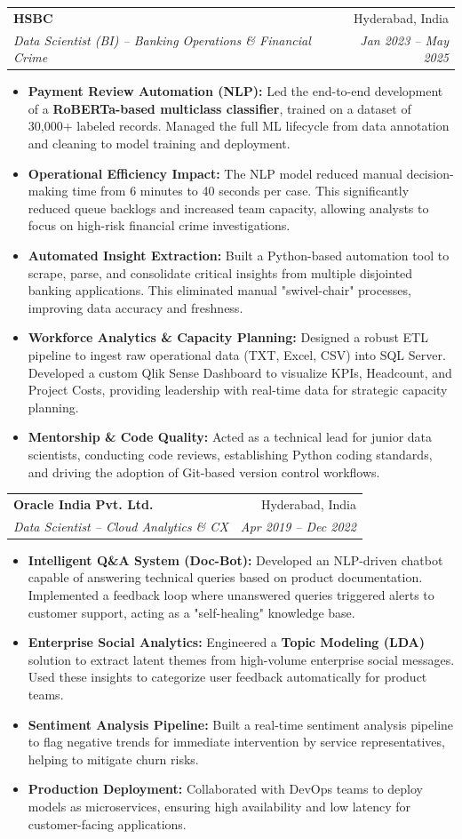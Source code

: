 \documentclass[letterpaper,10pt]{article}
\makeatletter
\newcommand{\resumeItem}[1]{
  \item\small{
    {#1 \vspace{1pt}} %
  }
}
\newcommand{\resumeSubheading}[4]{
  \vspace{-1pt}\item
    \begin{tabular*}{0.98\textwidth}[t]{l@{\extracolsep{\fill}}r}
      \textbf{#1} & #2 \\
      \textit{\small#3} & \textit{\small #4} \\
    \end{tabular*}\vspace{-6pt}
}
\newcommand{\resumeItemListStart}{\begin{itemize}}
\newcommand{\resumeItemListEnd}{\end{itemize}\vspace{-3pt}}
\makeatother
\begin{document}
    \resumeSubheading
      {HSBC}{Hyderabad, India}
      {Data Scientist (BI) -- Banking Operations \& Financial Crime}{Jan 2023 -- May 2025}
      \resumeItemListStart
        \resumeItem{\textbf{Payment Review Automation (NLP):} Led the end-to-end development of a \textbf{RoBERTa-based multiclass classifier}, trained on a dataset of 30,000+ labeled records. Managed the full ML lifecycle from data annotation and cleaning to model training and deployment.}
        \resumeItem{\textbf{Operational Efficiency Impact:} The NLP model reduced manual decision-making time from 6 minutes to 40 seconds per case. This significantly reduced queue backlogs and increased team capacity, allowing analysts to focus on high-risk financial crime investigations.}
        \resumeItem{\textbf{Automated Insight Extraction:} Built a Python-based automation tool to scrape, parse, and consolidate critical insights from multiple disjointed banking applications. This eliminated manual "swivel-chair" processes, improving data accuracy and freshness.}
        \resumeItem{\textbf{Workforce Analytics \& Capacity Planning:} Designed a robust ETL pipeline to ingest raw operational data (TXT, Excel, CSV) into SQL Server. Developed a custom Qlik Sense Dashboard to visualize KPIs, Headcount, and Project Costs, providing leadership with real-time data for strategic capacity planning.}
        \resumeItem{\textbf{Mentorship \& Code Quality:} Acted as a technical lead for junior data scientists, conducting code reviews, establishing Python coding standards, and driving the adoption of Git-based version control workflows.}
      \resumeItemListEnd

    \resumeSubheading
      {Oracle India Pvt. Ltd.}{Hyderabad, India}
      {Data Scientist -- Cloud Analytics \& CX}{Apr 2019 -- Dec 2022}
      \resumeItemListStart
        \resumeItem{\textbf{Intelligent Q\&A System (Doc-Bot):} Developed an NLP-driven chatbot capable of answering technical queries based on product documentation. Implemented a feedback loop where unanswered queries triggered alerts to customer support, acting as a "self-healing" knowledge base.}
        \resumeItem{\textbf{Enterprise Social Analytics:} Engineered a \textbf{Topic Modeling (LDA)} solution to extract latent themes from high-volume enterprise social messages. Used these insights to categorize user feedback automatically for product teams.}
        \resumeItem{\textbf{Sentiment Analysis Pipeline:} Built a real-time sentiment analysis pipeline to flag negative trends for immediate intervention by service representatives, helping to mitigate churn risks.}
        \resumeItem{\textbf{Production Deployment:} Collaborated with DevOps teams to deploy models as microservices, ensuring high availability and low latency for customer-facing applications.}
      \resumeItemListEnd
\end{document}
